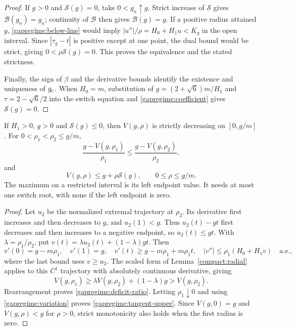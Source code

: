 \begin{proof}
If $g>0$ and $\mathcal S(g)=0$, take $0<g_n\uparrow g$.
Strict increase of $\mathcal S$ gives $\mathcal B(g_n)=g_n$;
continuity of $\mathcal B$ then gives $\mathcal B(g)=g$.
If a positive radius attained $g$, \eqref{gapregime:below-line}
would imply $|u''|/\rho=H_0+H_1u<K_g$ in the open interval.
Since $|\tau_g-t|$ is positive except at one point, the dual bound
would be strict, giving $0<\rho\mathcal S(g)=0$.
This proves the equivalence and the stated strictness.

Finally, the sign of $\beta$ and the derivative bounds identify the
existence and uniqueness of $g_{\rm c}$. When $H_0=m$, substitution of
$g=(2+\sqrt6)m/H_1$ and $\tau=2-\sqrt6/2$ into the switch equation
and \eqref{gapregime:coefficient} gives $\mathcal S(g)=0$.
\end{proof}

\begin{corollary}
\label{gapregime:radius-monotone}
If $H_1>0$, $g>0$ and $\mathcal S(g)\le0$, then $V(g,\rho)$ is strictly
decreasing on $[0,g/m]$. For $0<\rho_1<\rho_2\le g/m$,
\begin{equation}\label{gapregime:deficit-ratio}
 \frac{g-V(g,\rho_1)}{\rho_1}
 \le\frac{g-V(g,\rho_2)}{\rho_2},
\end{equation}
and
\begin{equation}\label{gapregime:tangent-upper}
 V(g,\rho)\le g+\rho\mathcal S(g),\qquad 0\le\rho\le g/m.
\end{equation}
The maximum on a restricted interval is its left endpoint value.
It needs at most one switch root, with none if the left endpoint is zero.
\end{corollary}
\begin{proof}
Let $u_2$ be the normalized extremal trajectory at $\rho_2$.
Its derivative first increases and then decreases to $g$, and
$u_2(1)<g$. Thus $u_2(t)-gt$ first decreases and then increases to a
negative endpoint, so $u_2(t)\le gt$. With $\lambda=\rho_1/\rho_2$, put
$v(t)=\lambda u_2(t)+(1-\lambda)gt$. Then
\[
 v'(0)=g-m\rho_1,\quad v'(1)=g,\quad
 v'(t)\ge g-m\rho_1+m\rho_1t,
 \quad |v''|\le\rho_1(H_0+H_1v)\quad\text{a.e.},
\]
where the last bound uses $v\ge u_2$.
The scaled form of Lemma~\ref{compact:radial} applies to this
$C^1$ trajectory with absolutely continuous derivative, giving
\begin{equation}\label{gapregime:mixture}
 V(g,\rho_1)\ge\lambda V(g,\rho_2)+(1-\lambda)g>V(g,\rho_2).
\end{equation}
Rearrangement proves \eqref{gapregime:deficit-ratio}.
Letting $\rho_1\downarrow0$ and using
\eqref{gapregime:variation} proves \eqref{gapregime:tangent-upper}.
Since $V(g,0)=g$ and $V(g,\rho)<g$ for $\rho>0$, strict monotonicity
also holds when the first radius is zero.
\end{proof}

